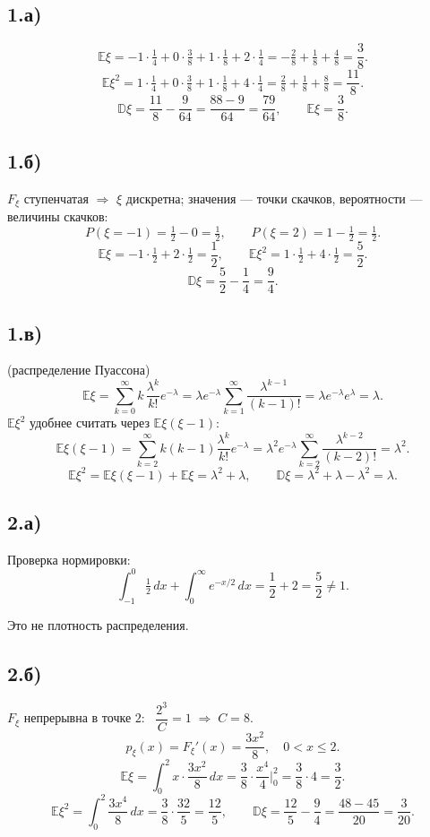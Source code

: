 \documentclass[11pt,a4paper]{article}
\newcommand{\E}{\mathbb{E}}
\newcommand{\D}{\mathbb{D}}
\begin{document}
\subsection*{1.а)}
\[
  \E\xi = -1\cdot\tfrac14 + 0\cdot\tfrac38 + 1\cdot\tfrac18 + 2\cdot\tfrac14
        = -\tfrac28 + \tfrac18 + \tfrac48 = \frac38 .
\]
\[
  \E\xi^2 = 1\cdot\tfrac14 + 0\cdot\tfrac38 + 1\cdot\tfrac18 + 4\cdot\tfrac14
          = \tfrac28 + \tfrac18 + \tfrac88 = \frac{11}{8} .
\]
\[
  \D\xi = \frac{11}{8} - \frac{9}{64} = \frac{88-9}{64} = \boxed{\frac{79}{64}},
  \qquad \boxed{\E\xi = \frac38}.
\]

\subsection*{1.б)}
$F_\xi$ ступенчатая $\Rightarrow$ $\xi$ дискретна; значения — точки скачков,
вероятности — величины скачков:
\[
  P(\xi=-1) = \tfrac12 - 0 = \tfrac12, \qquad P(\xi=2) = 1 - \tfrac12 = \tfrac12 .
\]
\[
  \E\xi = -1\cdot\tfrac12 + 2\cdot\tfrac12 = \boxed{\frac12}, \qquad
  \E\xi^2 = 1\cdot\tfrac12 + 4\cdot\tfrac12 = \frac52 .
\]
\[
  \D\xi = \frac52 - \frac14 = \boxed{\frac94}.
\]

\subsection*{1.в)} (распределение Пуассона)
\[
  \E\xi = \sum_{k=0}^{\infty} k\,\frac{\lambda^k}{k!}e^{-\lambda}
        = \lambda e^{-\lambda}\sum_{k=1}^{\infty}\frac{\lambda^{k-1}}{(k-1)!}
        = \lambda e^{-\lambda}e^{\lambda} = \boxed{\lambda}.
\]
$\E\xi^2$ удобнее считать через $\E\xi(\xi-1)$:
\[
  \E\xi(\xi-1) = \sum_{k=2}^{\infty} k(k-1)\frac{\lambda^k}{k!}e^{-\lambda}
  = \lambda^2 e^{-\lambda}\sum_{k=2}^{\infty}\frac{\lambda^{k-2}}{(k-2)!}
  = \lambda^2 .
\]
\[
  \E\xi^2 = \E\xi(\xi-1) + \E\xi = \lambda^2 + \lambda, \qquad
  \D\xi = \lambda^2 + \lambda - \lambda^2 = \boxed{\lambda}.
\]

\subsection*{2.а)}
Проверка нормировки:
\[
  \int_{-1}^{0}\tfrac12\,dx + \int_0^\infty e^{-x/2}\,dx = \frac12 + 2 = \frac52 \neq 1 .
\]

Это не плотность распределения. 

\subsection*{2.б)}
$F_\xi$ непрерывна в точке $2$: \ $\dfrac{2^3}{C} = 1 \;\Rightarrow\; C = 8$.
\[
  p_\xi(x) = F_\xi'(x) = \frac{3x^2}{8}, \quad 0<x\le 2 .
\]
\[
  \E\xi = \int_0^2 x\cdot\frac{3x^2}{8}\,dx = \frac38\cdot\frac{x^4}{4}\Big|_0^2
        = \frac38\cdot 4 = \boxed{\frac32}.
\]
\[
  \E\xi^2 = \int_0^2 \frac{3x^4}{8}\,dx = \frac38\cdot\frac{32}{5} = \frac{12}{5},
  \qquad
  \D\xi = \frac{12}{5} - \frac94 = \frac{48-45}{20} = \boxed{\frac{3}{20}}.
\]
\end{document}
